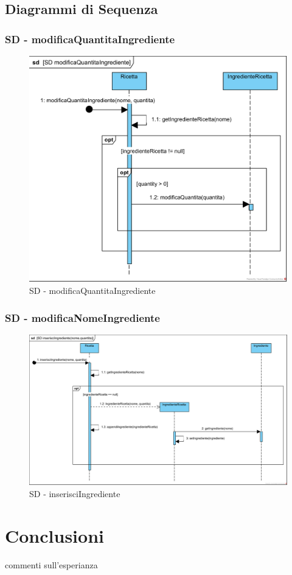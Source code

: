 \documentclass[a4paper,12pt]{report}
\begin{document}
      	\section{Diagrammi di Sequenza}    
		\subsection{SD - modificaQuantitaIngrediente}
			\begin{figure}[!h]
				\centering
				\includegraphics[width=0.7\linewidth]{image/SD-modificaQuantitaIngrediente.png}
				\caption{SD - modificaQuantitaIngrediente}\label{fig:1}
			\end{figure}	
		\newpage	
		\subsection{SD - modificaNomeIngrediente}
			\begin{figure}[!h]
				\centering
				\includegraphics[width=0.8\linewidth]{image/SD-inserisciIngrediente.png}
				\caption{SD - inserisciIngrediente}\label{fig:1}
			\end{figure}
			
			
      \chapter{Conclusioni}
	commenti sull'esperianza
    
\end{document}
